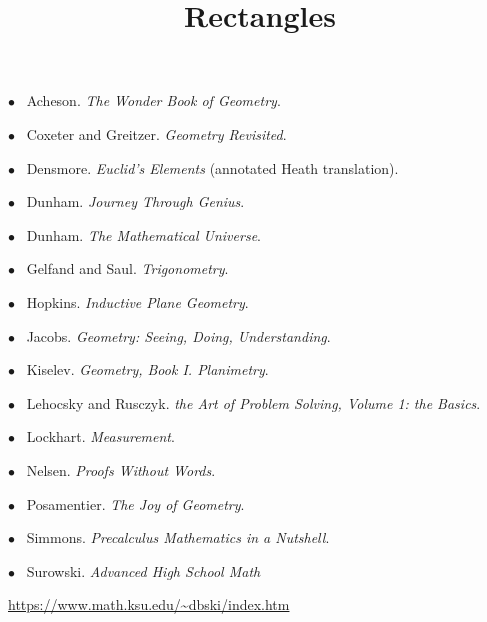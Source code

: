 \documentclass[11pt, oneside]{article}
\title{Rectangles}
\date{}
\begin{document}
\maketitle
\Large


$\bullet$ \ Acheson.  \emph{The Wonder Book of Geometry}.

$\bullet$ \ Coxeter and Greitzer.  \emph{Geometry Revisited}.

$\bullet$ \ Densmore. \emph{Euclid's Elements} (annotated Heath translation).

$\bullet$ \ Dunham. \emph{Journey Through Genius}.

$\bullet$ \ Dunham. \emph{The Mathematical Universe}.

$\bullet$ \ Gelfand and Saul. \emph{Trigonometry}.

$\bullet$ \ Hopkins. \emph{Inductive Plane Geometry}.

$\bullet$ \ Jacobs. \emph{Geometry:  Seeing, Doing, Understanding}.

$\bullet$ \ Kiselev. \emph{Geometry, Book I. Planimetry}.

$\bullet$ \ Lehocsky and Rusczyk.  \emph{the Art of Problem Solving, Volume 1:  the Basics}.

$\bullet$ \ Lockhart. \emph{Measurement}.

$\bullet$ \ Nelsen. \emph{Proofs Without Words}.

$\bullet$ \ Posamentier.  \emph{The Joy of Geometry}.

$\bullet$ \ Simmons.  \emph{Precalculus Mathematics in a Nutshell}.

$\bullet$ \ Surowski.  \emph{Advanced High School Math}

\url{https://www.math.ksu.edu/~dbski/index.htm}
\end{document}
